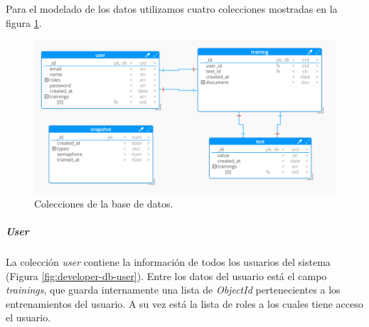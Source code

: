 \documentclass[12pt,a4paper,]{scrartcl}
\let\oldsubparagraph\subparagraph
\renewcommand{\subparagraph}[1]{\oldsubparagraph{#1}\mbox{}}
\begin{document}
Para el modelado de los datos utilizamos cuatro colecciones mostradas en la figura \ref{fig:developer-db-overview}.

\begin{figure}[H]

{\centering \includegraphics{assets/developer/db-overview.pdf} 

}

\caption{Colecciones de la base de datos.}\label{fig:developer-db-overview}
\end{figure}

\hypertarget{user}{%
\subparagraph{\texorpdfstring{\emph{User}}{User}}\label{user}}

La colección \emph{user} contiene la información de todos los usuarios del sistema (Figura \ref{fig:developer-db-user}). Entre los datos del usuario está el campo \emph{trainings}, que guarda internamente una lista de \emph{ObjectId} pertenecientes a los entrenamientos del usuario. A su vez está la lista de roles a los cuales tiene acceso el usuario.
\end{document}

